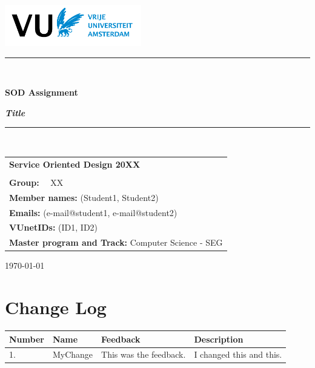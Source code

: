 \documentclass[a4paper]{article}
\newcommand{\arraystrechlength}{1.5}
\begin{document}
\begin{center}
\vspace{1mm}
\includegraphics[height=18mm]{figs/VUlogo.png}

\vspace*{1.5cm}

\rule{.9\linewidth}{.6pt}\\[0.4cm]
{\huge \bfseries SOD Assignment \par}
{\huge \bfseries \textit{Title}\par}\vspace{0.4cm}
\rule{.9\linewidth}{.6pt}\\[1.5cm]

\vspace*{2mm}

{\Large
\begin{tabular}{l}
{\bf Service Oriented Design 20XX} \\\\
{\bf Group:} ~~XX ~~~~ \\
{\bf Member names:} (Student1, Student2)\\
{\bf Emails:} (e-mail@student1, e-mail@student2)\\
{\bf VUnetIDs:} (ID1, ID2)\\
{\bf Master program and Track:} Computer Science - SEG\\
\end{tabular}
}


\vspace*{3cm}

\today\\[4cm] %

\end{center}

\tableofcontents
\thispagestyle{empty}
\clearpage

\section*{Change Log}
\begin{table}[h]
{\renewcommand{\arraystretch}{\arraystrechlength}
    \begin{tabular}{ | m{50pt} | m{80pt} | m{120pt} | m{120pt} | }
    
    \hline
    \rowcolor{vu-blue}
    \textcolor{vu-white}{\textbf{Number}} &
    \textcolor{vu-white}{\textbf{Name}} &
    \textcolor{vu-white}{\textbf{Feedback}} &
    \textcolor{vu-white}{\textbf{Description}} \\ \hline
    
    1. &
    MyChange &
    This was the feedback. &
    I changed this and this. \\ \hline
    
    \end{tabular}
}
\end{table}
\thispagestyle{empty}
\clearpage
\end{document}
